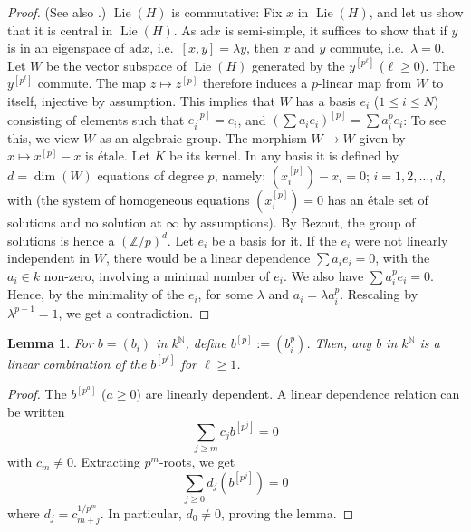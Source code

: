 \documentclass[11pt,a4paper]{article}
\theoremstyle{plain}
\newtheorem{lemma}[theorem]{Lemma}
\theoremstyle{definition}
\DeclareMathOperator{\Lie}{Lie}
\newcommand{\ZZ}{\mathbb{Z}}
\newcommand{\NN}{\mathbb{N}}
\newcommand{\ad}{\mathrm{ad}}
\begin{document}
\begin{proof}
(See also \cite[IV, \S3, Lemma~3.7]{DG}.) $\Lie(H)$ is commutative: Fix $x$ in $\Lie(H)$, and let us show that it is central in $\Lie(H)$. As $\ad x$ is semi-simple, it suffices to show that if $y$ is in an eigenspace of $\ad x$, i.e.~$[x,y] = \lambda y$, then $x$ and $y$ commute, i.e.~$\lambda = 0$. Let $W$ be the vector subspace of $\Lie(H)$ generated by the $y^{[p^\ell]}$ ($\ell \geq 0$). The $y^{[p^\ell]}$ commute. The map $z \mapsto z^{[p]}$ therefore induces a $p$-linear map from $W$ to itself, injective by assumption. This implies that $W$ has a basis $e_i$ ($1 \leq i \leq N$) consisting of elements such that $e_i^{[p]} = e_i$, and $(\sum a_i e_i)^{[p]} = \sum a_i^p e_i$: To see this, we view $W$ as an algebraic group. The morphism $W \to W$ given by $x \mapsto x^{[p]} - x$ is \'etale. Let $K$ be its kernel. In any basis it is defined by $d = \dim(W)$ equations of degree $p$, namely: $(x_i^{[p]}) - x_i = 0$; $i = 1, 2, \ldots, d$, with (the system of homogeneous equations $(x_i^{[p]}) = 0$ has an \'etale set of solutions and no solution at $\infty$ by assumptions). By Bezout, the group of solutions is hence a $(\ZZ/p)^d$. Let $e_i$ be a basis for it. If the $e_i$ were not linearly independent in $W$, there would be a linear dependence $\sum a_i e_i = 0$, with the $a_i \in k$ non-zero, involving a minimal number of $e_i$. We also have $\sum a_i^p e_i = 0$. Hence, by the minimality of the $e_i$, for some $\lambda$ and $a_i = \lambda a_i^p$. Rescaling by $\lambda^{p-1} = 1$, we get a contradiction. \qedhere
\end{proof}

\begin{lemma} \label{lem:2.9}
For $b = (b_i)$ in $k^\NN$, define $b^{[p]} := (b_i^p)$. Then, any $b$ in $k^\NN$ is a linear combination of the $b^{[p^\ell]}$ for $\ell \geq 1$.
\end{lemma}

\begin{proof}
The $b^{[p^a]}$ ($a \geq 0$) are linearly dependent. A linear dependence relation can be written
\begin{equation} \label{eq:2.9.1}
\sum_{j \geq m} c_j b^{[p^j]} = 0
\end{equation}
with $c_m \neq 0$. Extracting $p^m$-roots, we get
\begin{equation} \label{eq:2.9.2}
\sum_{j \geq 0} d_j (b^{[p^j]}) = 0
\end{equation}
where $d_j = c_{m+j}^{1/p^m}$. In particular, $d_0 \neq 0$, proving the lemma. \qedhere
\end{proof}
\end{document}
